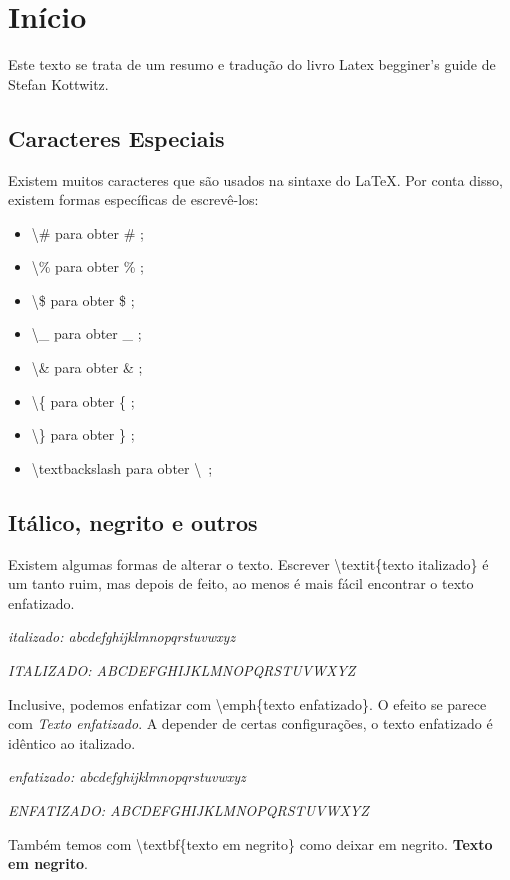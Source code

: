 \documentclass[a4paper, 12pt, oneside]{book}
\begin{document}


\chapter{Início}
Este texto se trata de um resumo e tradução do livro Latex begginer's guide de Stefan Kottwitz.

\section{Caracteres Especiais}
Existem muitos caracteres que são usados na sintaxe do \LaTeX.
Por conta disso, existem formas específicas de escrevê-los:
\begin{itemize}
	\item \textbackslash \# para obter \# ;
	\item \textbackslash \% para obter \% ;
	\item \textbackslash \$ para obter \$ ;
	\item \textbackslash \_ para obter \_ ;
	\item \textbackslash \& para obter \& ;
	\item \textbackslash \{ para obter \{ ;
	\item \textbackslash \} para obter \} ;
	\item \textbackslash textbackslash para obter \textbackslash\ ;
\end{itemize}

\section{Itálico, negrito e outros}
Existem algumas formas de alterar o texto.
Escrever \textbackslash textit\{texto italizado\} é um tanto ruim,
mas depois de feito, ao menos é mais fácil encontrar o texto enfatizado.

\textit{italizado: abcdefghijklmnopqrstuvwxyz}

\textit{ITALIZADO: ABCDEFGHIJKLMNOPQRSTUVWXYZ}

Inclusive, podemos enfatizar com \textbackslash emph\{texto enfatizado\}.
O efeito se parece com \emph{Texto enfatizado}.
A depender de certas configurações, o texto enfatizado é idêntico ao italizado.

\emph{enfatizado: abcdefghijklmnopqrstuvwxyz}

\emph{ENFATIZADO: ABCDEFGHIJKLMNOPQRSTUVWXYZ}

Também temos com \textbackslash textbf\{texto em negrito\} como deixar em negrito.
\textbf{Texto em negrito}.
\end{document}
